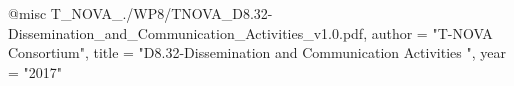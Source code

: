 @misc{ T_NOVA_./WP8/TNOVA_D8.32-Dissemination_and_Communication_Activities_v1.0.pdf,
       author = "T-NOVA Consortium",
       title = "D8.32-Dissemination and Communication Activities ",
       year = "2017" }
